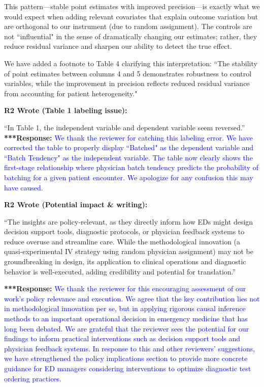 \documentclass[11pt]{article}
\newenvironment{quote2}
{ \bigskip
\noindent
         \small\em
         \baselineskip=14pt
}
\newcommand{\1}{\hbox{\rm 1\kern-.35em 1}}
\begin{document}
{{{{This pattern—stable point estimates with improved precision—is exactly what we would expect when adding relevant covariates that explain outcome variation but are orthogonal to our instrument (due to random assignment). The controls are not ``influential" in the sense of dramatically changing our estimates; rather, they reduce residual variance and sharpen our ability to detect the true effect.

We have added a footnote to Table 4 clarifying this interpretation: ``The stability of point estimates between columns 4 and 5 demonstrates robustness to control variables, while the improvement in precision reflects reduced residual variance from accounting for patient heterogeneity."
\color{black}

\begin{quote2}
\textbf{R2 Wrote (Table 1 labeling issue):}  

\noindent``In Table 1, the independent variable and dependent variable seem reversed.” 
\end{quote2}

\noindent\textbf{***Response:} \textcolor{blue}{We thank the reviewer for catching this labeling error. We have corrected the table to properly display ``Batched" as the dependent variable and ``Batch Tendency" as the independent variable. The table now clearly shows the first-stage relationship where physician batch tendency predicts the probability of batching for a given patient encounter. We apologize for any confusion this may have caused.}

\begin{quote2}
\textbf{R2 Wrote (Potential impact \& writing):}  

\noindent``The insights are policy-relevant, as they directly inform how EDs might design decision support
tools, diagnostic protocols, or physician feedback systems to reduce overuse and streamline
care. While the methodological innovation (a quasi-experimental IV strategy using random
physician assignment) may not be groundbreaking in design, its application to clinical
operations and diagnostic behavior is well-executed, adding credibility and potential for
translation.” 

\end{quote2}

\noindent\textbf{***Response:} \textcolor{blue}{We thank the reviewer for this encouraging assessment of our work's policy relevance and execution. We agree that the key contribution lies not in methodological innovation per se, but in applying rigorous causal inference methods to an important operational decision in emergency medicine that has long been debated. We are grateful that the reviewer sees the potential for our findings to inform practical interventions such as decision support tools and physician feedback systems. In response to this and other reviewers' suggestions, we have strengthened the policy implications section to provide more concrete guidance for ED managers considering interventions to optimize diagnostic test ordering practices.}



}}}}
\end{document}
